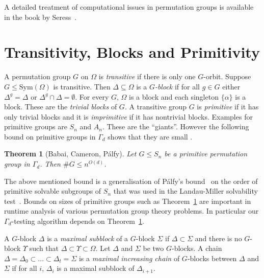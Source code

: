\documentclass[11pt]{madras}%
\newtheorem{theorem}{Theorem}[chapter]
\theoremstyle{remark}
\newcommand{\Sym}[1]{{\ensuremath{\mathrm{Sym}\left(#1\right)}}}
\begin{document}
A detailed treatment of computational issues in permutation groups is
available in the book by Seress~\cite{seress2003permutationalgo}.
\section{Transitivity, Blocks and Primitivity}

A permutation group $G$ on $\Omega$ is
\emph{transitive} if there is only one $G$-orbit.
Suppose $G \leq \Sym{\Omega}$ is transitive.  Then $\Delta\subseteq
\Omega$ is a \emph{$G$-block} if for all $g \in G$ either
$\Delta^g = \Delta$ or $\Delta^g \cap \Delta=\emptyset$.  For every
$G$, $\Omega$ is a block and each singleton $\{\alpha\}$ is a block.
These are the \emph{trivial blocks} of $G$. A transitive group $G$ is
\emph{primitive} if it has only trivial blocks and it
is \emph{imprimitive} if it has nontrivial blocks.
Examples for primitive groups are $S_n$ and $A_n$. These are the
``giants''.  However the following bound on primitive groups in
$\Gamma_d$ shows that they are small \cite{babai82primitive}.

\begin{theorem}[Babai, Cameron, P\'alfy]%
%
\label{thm-babai-cameron-palfy}
  Let $G \leq S_n$ be a primitive permutation group in $\Gamma_d$.
  Then $\# G \leq n^{O(d)}$.
\end{theorem}


The above mentioned bound is a generalisation of P\'alfy's
bound~\cite{palfy82primitive} on the order of primitive solvable
subgroups of $S_n$ that was used in the Landau-Miller solvability
test~\cite{landau85solvability}. Bounds on sizes of primitive groups
such as Theorem~\ref{thm-babai-cameron-palfy} are important in runtime
analysis of various permutation group theory problems. In particular
our $\Gamma_d$-testing algorithm depends on
Theorem~\ref{thm-babai-cameron-palfy}.

A $G$-block $\Delta$ is a \emph{maximal subblock} of a $G$-block
$\Sigma$ if $\Delta \subset \Sigma$ and there is no $G$-block
$\Upsilon$ such that $\Delta \subset \Upsilon \subset \Omega$. Let
$\Delta$ and $\Sigma$ be two $G$-blocks. A chain $\Delta = \Delta_0
\subset \ldots \subset \Delta_t = \Sigma$ is a \emph{maximal
  increasing chain} of $G$-blocks between $\Delta$ and $\Sigma$ if for
all $i$, $\Delta_i$ is a maximal subblock of $\Delta_{i+1}$.%
%
%
%
\end{document}
